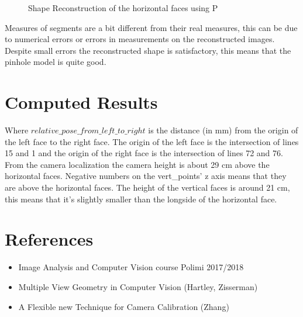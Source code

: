 \documentclass[11pt, oneside]{article}   	%
\begin{document}
\begin{figure}
 \centering
    \qquad
    \caption{Shape Reconstruction of the horizontal faces using P}%
    \label{hor_sr}%
\end{figure}
Measures of segments are a bit different from their real measures, this can be due to numerical errors or errors in measurements on the reconstructed images.
Despite small errors the reconstructed shape is satisfactory, this means that the pinhole model is quite good.
 
\section{Computed Results}

Where $relative\_pose\_from\_left\_to\_right$ is the distance (in mm) from the origin of the left face to the right face. The origin of the left face is the intersection of lines 15 and 1 and the origin of the right face is the intersection of lines 72 and 76.
From the camera localization the camera height is about 29 cm above the horizontal faces. 
Negative numbers on the vert\_points' z axis means that they are above the horizontal faces. The height of the vertical faces is around 21 cm, this means that it's slightly smaller than the longside of the horizontal face. 
 \section{References}
 \begin{itemize}
 \item Image Analysis and Computer Vision course Polimi 2017/2018
 \item Multiple View Geometry in Computer Vision (Hartley, Zisserman)
 \item A Flexible new Technique for Camera Calibration (Zhang)
 \end{itemize}
\end{document}
